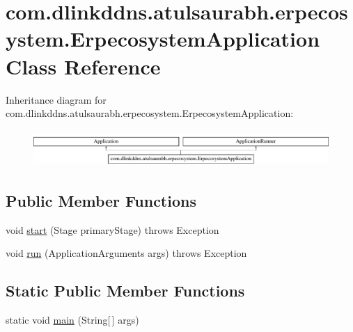 \hypertarget{classcom_1_1dlinkddns_1_1atulsaurabh_1_1erpecosystem_1_1_erpecosystem_application}{}\section{com.\+dlinkddns.\+atulsaurabh.\+erpecosystem.\+Erpecosystem\+Application Class Reference}
\label{classcom_1_1dlinkddns_1_1atulsaurabh_1_1erpecosystem_1_1_erpecosystem_application}
Inheritance diagram for com.\+dlinkddns.\+atulsaurabh.\+erpecosystem.\+Erpecosystem\+Application\+:\begin{figure}[H]
\begin{center}
\leavevmode
\includegraphics[height=1.407035cm]{classcom_1_1dlinkddns_1_1atulsaurabh_1_1erpecosystem_1_1_erpecosystem_application}
\end{center}
\end{figure}
\subsection*{Public Member Functions}
\begin{DoxyCompactItemize}
\item 
void \mbox{\hyperlink{classcom_1_1dlinkddns_1_1atulsaurabh_1_1erpecosystem_1_1_erpecosystem_application_a90a76d5aca54f84a9873a8121d3d0fad}{start}} (Stage primary\+Stage)  throws Exception 
\item 
void \mbox{\hyperlink{classcom_1_1dlinkddns_1_1atulsaurabh_1_1erpecosystem_1_1_erpecosystem_application_a440135636cc3274c5f73d337de252c6d}{run}} (Application\+Arguments args)  throws Exception 
\end{DoxyCompactItemize}
\subsection*{Static Public Member Functions}
\begin{DoxyCompactItemize}
\item 
static void \mbox{\hyperlink{classcom_1_1dlinkddns_1_1atulsaurabh_1_1erpecosystem_1_1_erpecosystem_application_a093269f7aa35ba687eaf9da0383564ab}{main}} (String\mbox{[}$\,$\mbox{]} args)
\end{DoxyCompactItemize}


